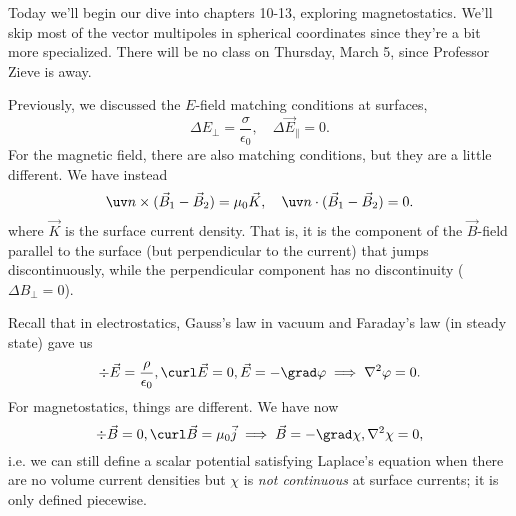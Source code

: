 Today we'll begin our dive into chapters 10-13, exploring magnetostatics. We'll skip most of the vector multipoles in spherical coordinates since they're a bit more specialized. There will be no class on Thursday, March 5, since Professor Zieve is away.

Previously, we discussed the $E$-field matching conditions at surfaces,
\begin{equation}
    \Delta E_\perp = \frac{\sigma}{\epsilon_0}, \quad \Delta \vec E_\parallel =0.
\end{equation}
For the magnetic field, there are also matching conditions, but they are a little different. We have instead
\begin{equation}
    \uv n \times (\vec B_1 - \vec B_2) = \mu_0 \vec K, \quad \uv n \cdot (\vec B_1 - \vec B_2) =0.
\end{equation}
where $\vec K$ is the surface current density. That is, it is the component of the $\vec B$-field parallel to the surface (but perpendicular to the current) that jumps discontinuously, while the perpendicular component has no discontinuity ($\Delta B_\perp =0$).

Recall that in electrostatics, Gauss's law in vacuum and Faraday's law (in steady state) gave us
\begin{equation}
    \div \vec E = \frac{\rho}{\epsilon_0}, \curl \vec E = 0, \vec E = -\grad \varphi \implies \nabla^2 \varphi=0.
\end{equation}
For magnetostatics, things are different. We have now
\begin{equation}
    \div \vec B =0 , \curl \vec B = \mu_0 \vec j \implies \vec B = -\grad \chi, \nabla^2 \chi =0,
\end{equation}
i.e. we can still define a scalar potential satisfying Laplace's equation when there are no volume current densities but $\chi$ is \emph{not continuous} at surface currents; it is only defined piecewise.

